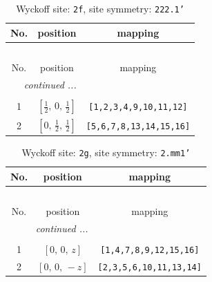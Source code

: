 \documentclass[fleqn,8pt]{jsarticle}
\begin{document}
\renewcommand{\arraystretch}{1.2}
\begin{longtable}{ccc}
\caption{Wyckoff site: {\tt 2f}, site symmetry: {\tt 222.1'}}
 \\
 \hline \hline
No. & position & mapping \\ \hline \endfirsthead

\multicolumn{2}{l}{\tablename\ \thetable{}} \\
 \hline \hline
No. & position & mapping \\ \hline \endhead

 \hline \hline
\multicolumn{2}{r}{\footnotesize\it continued ...} \\ \endfoot

 \hline \hline
\multicolumn{2}{r}{} \\ \endlastfoot

1 & $\left[ \frac{1}{2},\, 0,\, \frac{1}{2} \right]$ & {\tt [1,2,3,4,9,10,11,12]} \\ \hline
2 & $\left[ 0,\, \frac{1}{2},\, \frac{1}{2} \right]$ & {\tt [5,6,7,8,13,14,15,16]} \\
\end{longtable}
\renewcommand{\arraystretch}{1.2}
\begin{longtable}{ccc}
\caption{Wyckoff site: {\tt 2g}, site symmetry: {\tt 2.mm1'}}
 \\
 \hline \hline
No. & position & mapping \\ \hline \endfirsthead

\multicolumn{2}{l}{\tablename\ \thetable{}} \\
 \hline \hline
No. & position & mapping \\ \hline \endhead

 \hline \hline
\multicolumn{2}{r}{\footnotesize\it continued ...} \\ \endfoot

 \hline \hline
\multicolumn{2}{r}{} \\ \endlastfoot

1 & $\left[ 0,\, 0,\, z \right]$ & {\tt [1,4,7,8,9,12,15,16]} \\ \hline
2 & $\left[ 0,\, 0,\, - z \right]$ & {\tt [2,3,5,6,10,11,13,14]} \\
\end{longtable}
\renewcommand{\arraystretch}{1.2}
\end{document}
